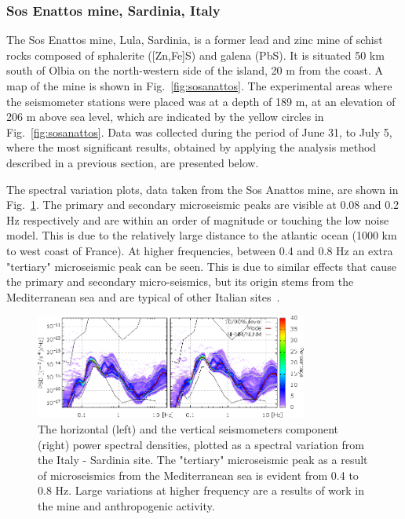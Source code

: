 \subsubsection*{Sos Enattos mine, Sardinia, Italy}
The Sos Enattos mine, Lula, Sardinia, is a former lead and zinc mine of schist rocks composed of sphalerite ([Zn,Fe]S) and galena (PbS). It is situated 50 km south of Olbia on the north-western side of the island, 20 m from the coast. A map of the mine is shown in Fig.~\ref{fig:sosanattos}. The experimental areas where the seismometer stations were placed was at a depth of 189 m, at an elevation of 206 m above sea level, which are indicated by the yellow circles in Fig.~\ref{fig:sosanattos}. Data was collected during the period of June 31, to July 5, where the most significant results, obtained by applying the analysis method described in a previous section, are presented below.

The spectral variation plots, data taken from the Sos Anattos mine, are shown in Fig.~\ref{fig:Lula-A_multiplot1}. The primary and secondary microseismic peaks are visible at 0.08 and 0.2 Hz respectively and are within an order of magnitude or touching the low noise model. This is due to the relatively large distance to the atlantic ocean (1000 km to west coast of France). At higher frequencies, between 0.4 and 0.8 Hz an extra "tertiary" microseismic peak can be seen. This is due to similar effects that cause the primary and secondary micro-seismics, but its origin stems from the Mediterranean sea and are typical of other Italian sites~\cite{marchetti}.
\begin{figure}[h!]
	\begin{center}
		\includegraphics[width= 0.8\textwidth]{./Sec_SiteInfra/Figures/Lula-A_multiplot1}
		\caption{The horizontal (left) and the vertical seismometers component (right) power spectral densities, plotted as a spectral variation from the Italy - Sardinia site. The "tertiary" microseismic peak as a result of microseismics from the Mediterranean sea is evident from 0.4 to 0.8 Hz. Large variations at higher frequency are a results of work in the mine and anthropogenic activity.}
		\label{fig:Lula-A_multiplot1}
	\end{center}
\end{figure}

